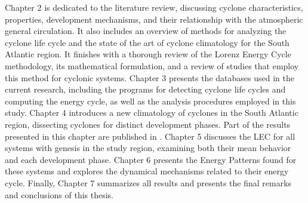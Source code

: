 Chapter 2 is dedicated to the literature review, discussing cyclone characteristics, properties, development mechanisms, and their relationship with the atmospheric general circulation. It also includes an overview of methods for analyzing the cyclone life cycle and the state of the art of cyclone climatology for the South Atlantic region. It finishes with a thorough review of the Lorenz Energy Cycle methodology, its mathematical formulation, and a review of studies that employ this method for cyclonic systems. Chapter 3 presents the databases used in the current research, including the programs for detecting cyclone life cycles and computing the energy cycle, as well as the analysis procedures employed in this study. Chapter 4 introduces a new climatology of cyclones in the South Atlantic region, dissecting cyclones for distinct development phases. Part of the results presented in this chapter are published in \citet{deSouza2024}. Chapter 5 discusses the LEC for all systems with genesis in the study region, examining both their mean behavior and each development phase. Chapter 6 presents the Energy Patterns found for these systems and explores the dynamical mechanisms related to their energy cycle. Finally, Chapter 7 summarizes all results and presents the final remarks and conclusions of this thesis.
